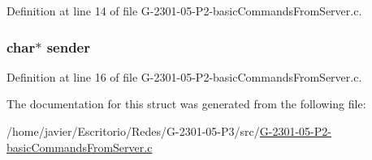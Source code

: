 Definition at line 14 of file G-\/2301-\/05-\/\-P2-\/basic\-Commands\-From\-Server.\-c.

\hypertarget{structthread_audio_args_ab092ba1f84e458809eb91a5786b281de}{
\subsubsection[{sender}]{\setlength{\rightskip}{0pt plus 5cm}char$\ast$ sender}}\label{structthread_audio_args_ab092ba1f84e458809eb91a5786b281de}


Definition at line 16 of file G-\/2301-\/05-\/\-P2-\/basic\-Commands\-From\-Server.\-c.



The documentation for this struct was generated from the following file\-:\begin{DoxyCompactItemize}
\item 
/home/javier/\-Escritorio/\-Redes/\-G-\/2301-\/05-\/\-P3/src/\hyperlink{_g-2301-05-_p2-basic_commands_from_server_8c}{G-\/2301-\/05-\/\-P2-\/basic\-Commands\-From\-Server.\-c}\end{DoxyCompactItemize}
